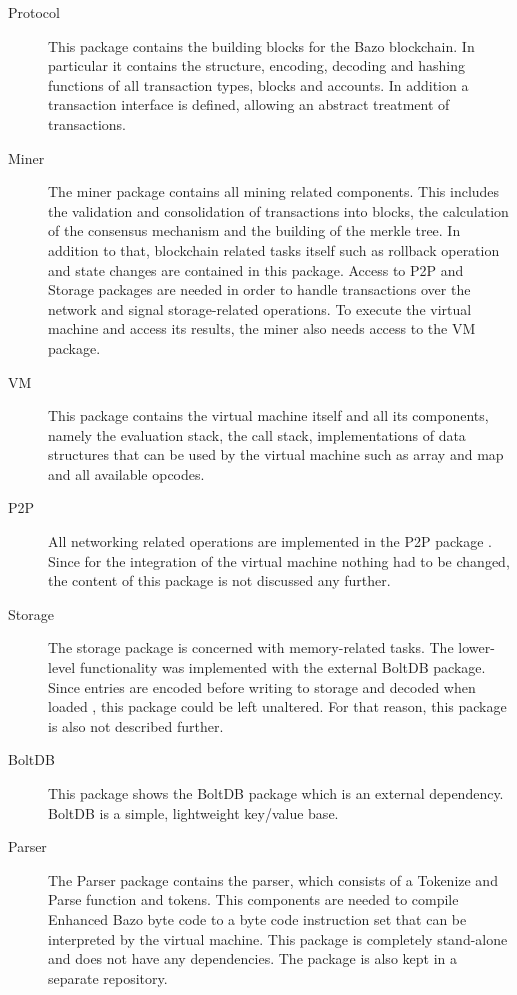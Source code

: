 \begin{description}
	\item[Protocol] This package contains the building blocks for the Bazo blockchain. In particular it contains the structure, encoding, decoding and hashing functions of all transaction types, blocks and accounts. In addition a transaction interface is defined, allowing an abstract treatment of transactions. \cite{ba_miner}
	\item[Miner] The miner package contains all mining related components. This includes the validation and consolidation of transactions into blocks, the calculation of the consensus mechanism and the building of the merkle tree. In addition to that, blockchain related tasks itself such as rollback operation and state changes are contained in this package. Access to P2P and Storage packages are needed in order to handle transactions over the network and signal storage-related operations. \cite{ba_miner} To execute the virtual machine and access its results, the miner also needs access to the VM package.
	\item[VM] This package contains the virtual machine itself and all its components, namely the evaluation stack, the call stack, implementations of data structures that can be used by the virtual machine such as array and map and all available opcodes.
	\item[P2P] All networking related operations are implemented in the P2P package \cite{ba_miner}. Since for the integration of the virtual machine nothing had to be changed, the content of this package is not discussed any further.
	\item[Storage] The storage package is concerned with memory-related tasks. The lower-level functionality was implemented with the external BoltDB package. Since entries are encoded before writing to storage and decoded when loaded \cite{ba_miner}, this package could be left unaltered. For that reason, this package is also not described further.
	\item[BoltDB] This package shows the BoltDB package which is an external dependency. BoltDB is a simple, lightweight key/value base. \cite{ba_miner}
	\item[Parser] The Parser package contains the parser, which consists of a Tokenize and Parse function and tokens. This components are needed to compile \flqq Enhanced Bazo byte code\frqq{ } to a byte code instruction set that can be interpreted by the virtual machine. This package is completely stand-alone and does not have any dependencies. The package is also kept in a separate repository.
\end{description}

